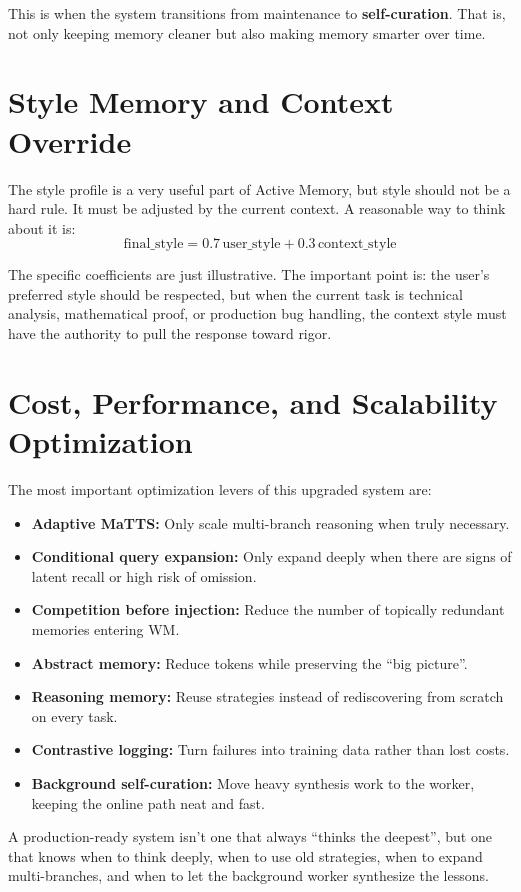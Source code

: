 \documentclass[a4paper,12pt]{article}
\begin{document}
This is when the system transitions from maintenance to \textbf{self-curation}. That is, not only keeping memory cleaner but also making memory smarter over time.

\section{Style Memory and Context Override}

The style profile is a very useful part of Active Memory, but style should not be a hard rule. It must be adjusted by the current context. A reasonable way to think about it is:
\[
\text{final\_style} = 0.7\,\text{user\_style} + 0.3\,\text{context\_style}
\]

The specific coefficients are just illustrative. The important point is: the user's preferred style should be respected, but when the current task is technical analysis, mathematical proof, or production bug handling, the context style must have the authority to pull the response toward rigor.

\section{Cost, Performance, and Scalability Optimization}

The most important optimization levers of this upgraded system are:
\begin{itemize}
    \item \textbf{Adaptive MaTTS:} Only scale multi-branch reasoning when truly necessary.
    \item \textbf{Conditional query expansion:} Only expand deeply when there are signs of latent recall or high risk of omission.
    \item \textbf{Competition before injection:} Reduce the number of topically redundant memories entering WM.
    \item \textbf{Abstract memory:} Reduce tokens while preserving the ``big picture''.
    \item \textbf{Reasoning memory:} Reuse strategies instead of rediscovering from scratch on every task.
    \item \textbf{Contrastive logging:} Turn failures into training data rather than lost costs.
    \item \textbf{Background self-curation:} Move heavy synthesis work to the worker, keeping the online path neat and fast.
\end{itemize}

A production-ready system isn't one that always ``thinks the deepest'', but one that knows when to think deeply, when to use old strategies, when to expand multi-branches, and when to let the background worker synthesize the lessons.
\end{document}
